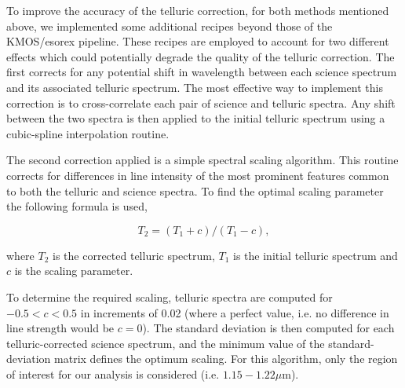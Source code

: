 \documentclass[manuscript]{aastex}
\begin{document}
To improve the accuracy of the telluric correction,
for both methods mentioned above,
we implemented some additional recipes beyond those of the KMOS/esorex pipeline.
These recipes are employed to account for two different effects which could potentially degrade the quality of the telluric correction.
The first corrects for any potential shift in wavelength between each science spectrum and its associated telluric spectrum.
The most effective way to implement this correction is to cross-correlate each pair of science and telluric spectra.
Any shift between the two spectra is then applied to the initial telluric spectrum using a cubic-spline interpolation routine.


The second correction applied is a simple spectral scaling algorithm.
This routine corrects for differences in line intensity of the most prominent features common to both the telluric and science spectra.
To find the optimal scaling parameter the following formula is used,

\begin{equation} \label{eq:shiftandres}
T_{2} = (T_{1} + c) / (T_{1} - c),
\end{equation}

\noindent where $T_{2}$ is the corrected telluric spectrum, $T_{1}$ is the initial telluric spectrum and $c$ is the scaling parameter.

To determine the required scaling,
telluric spectra are computed for $-0.5 < c < 0.5$ in increments of 0.02
(where a perfect value, i.e. no difference in line strength would be $c = 0$).
The standard deviation is then computed for each telluric-corrected science spectrum, and the minimum value of the standard-deviation matrix defines the optimum scaling.
For this algorithm, only the region of interest for our analysis is considered (i.e. $1.15 - 1.22\mu$m).
\end{document}
